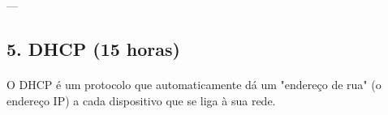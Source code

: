 \documentclass[10pt,a4paper]{article}
\newcommand{\guia}[1]{\textcolor{darkblue}{#1}} %
\begin{document}
	---
	
	\guia{
	}
	\subsection*{5. DHCP (15 horas)}
	\vspace{-1.2em}
	\paragraph{}
	O DHCP é um protocolo que automaticamente dá um "endereço de rua" (o endereço IP) a cada dispositivo que se liga à sua rede.
	
\end{document}
